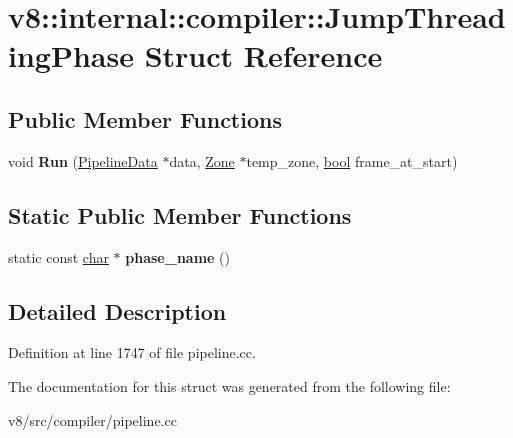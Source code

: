\hypertarget{structv8_1_1internal_1_1compiler_1_1JumpThreadingPhase}{}\section{v8\+:\+:internal\+:\+:compiler\+:\+:Jump\+Threading\+Phase Struct Reference}
\label{structv8_1_1internal_1_1compiler_1_1JumpThreadingPhase}
\subsection*{Public Member Functions}
\begin{DoxyCompactItemize}
\item 
\mbox{\label{structv8_1_1internal_1_1compiler_1_1JumpThreadingPhase_a6092be8e2287cdaf43bd20d219a90c2a}} 
void {\bfseries Run} (\mbox{\hyperlink{classv8_1_1internal_1_1compiler_1_1PipelineData}{Pipeline\+Data}} $\ast$data, \mbox{\hyperlink{classv8_1_1internal_1_1Zone}{Zone}} $\ast$temp\+\_\+zone, \mbox{\hyperlink{classbool}{bool}} frame\+\_\+at\+\_\+start)
\end{DoxyCompactItemize}
\subsection*{Static Public Member Functions}
\begin{DoxyCompactItemize}
\item 
\mbox{\label{structv8_1_1internal_1_1compiler_1_1JumpThreadingPhase_a3791b1a3a77010f2cad2166563ec7358}} 
static const \mbox{\hyperlink{classchar}{char}} $\ast$ {\bfseries phase\+\_\+name} ()
\end{DoxyCompactItemize}


\subsection{Detailed Description}


Definition at line 1747 of file pipeline.\+cc.



The documentation for this struct was generated from the following file\+:\begin{DoxyCompactItemize}
\item 
v8/src/compiler/pipeline.\+cc\end{DoxyCompactItemize}
